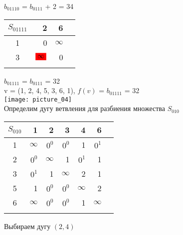 \documentclass[12pt]{article}
\begin{document}
$b_{01110}$ = $b_{0111}$ + 2 = 34\\

\begin{flushleft}
\begin{tabular}{c||rr||c}
$S_{01111}$  &2  &  6 & \\
\hline
\hline
1 &  0                   & $\infty$ & \\
3 &  $\colorbox{red}{$\infty$}$            & 0 & \\
\hline
\hline
 & & & \\
\end{tabular}
\end{flushleft}

$b_{01111}$ = $b_{0111}$  = 32\\


v = (1, 2, 4, 5, 3, 6, 1), $f(v)$ = $b_{01111}$  = 32\\

\texttt{[image: picture\_04]}\\ 



Определим дугу ветвления для разбиения множества $S_{010}$\\

\begin{flushleft}
 \begin{tabular}{c||rrrrr||c}
$S_{010}$ & 1 &2 & 3 & 4 & 6 & \\
\hline
\hline
1 & $\infty$ & $0^0$ & $0^0$ & 1  & $0^1$ & \\
2 & $0^0$ & $\infty$ & 1 & $0^1$  & 1 & \\
3 & $0^1$ & 1 & $\infty$ & 2  & 1 & \\
5 & 1 & $0^0$ & $0^0$ & $\infty$  & 2 \\
6 & $\infty$ & $0^0$ & $0^0$ & 1 & $\infty$ & \\
\hline
\hline
 & &   &  &  &  & \\
\end{tabular}
\end{flushleft}

Выбираем дугу $(2,4)$
\end{document}
